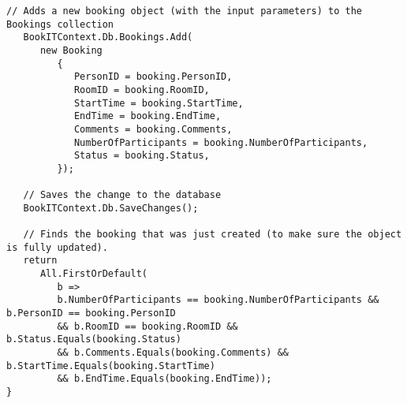 \begin{lstlisting}[caption= Logik til oprettelse af booking]
   // Adds a new booking object (with the input parameters) to the Bookings collection
   BookITContext.Db.Bookings.Add(
      new Booking
         {
            PersonID = booking.PersonID,
            RoomID = booking.RoomID,
            StartTime = booking.StartTime,
            EndTime = booking.EndTime,
            Comments = booking.Comments,
            NumberOfParticipants = booking.NumberOfParticipants,
            Status = booking.Status,
         });

   // Saves the change to the database
   BookITContext.Db.SaveChanges();

   // Finds the booking that was just created (to make sure the object is fully updated).
   return
      All.FirstOrDefault(
         b =>
         b.NumberOfParticipants == booking.NumberOfParticipants && b.PersonID == booking.PersonID
         && b.RoomID == booking.RoomID && b.Status.Equals(booking.Status)
         && b.Comments.Equals(booking.Comments) && b.StartTime.Equals(booking.StartTime)
         && b.EndTime.Equals(booking.EndTime));
}
\end{lstlisting}